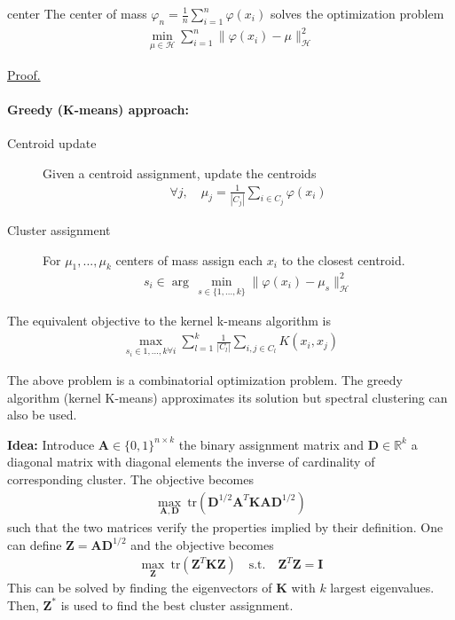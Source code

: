 \documentclass[10pt]{article}
\begin{document}
\begin{Proposition}{}{center}
  The center of mass $\varphi_n = \frac{1}{n}\sum_{i=1}^n\varphi(x_i)$ solves
  the optimization problem
  \begin{align*}
    \min_{\mu \in \mathcal{H}}\sum_{i=1}^n\lVert \varphi(x_i) - \mu 
    \rVert^2_\mathcal{H}
  \end{align*}
  \par \hfill \hyperref[prf:center]{\small Proof.}
\end{Proposition}

\paragraph{Greedy (K-means) approach:}
\begin{description}
  \item[Centroid update] Given a centroid assignment, update the centroids 
  \begin{align*}
    \forall j,\quad \mu_j = \frac{1}{|C_j|}\sum_{i\in C_j}\varphi(x_i)
  \end{align*} 
  \item[Cluster assignment] For $\mu_1, ..., \mu_k$ centers of mass assign each 
  $x_i$ to the closest centroid. 
  \begin{align*}
    s_i \in \arg\,\min_{s\in \{1, ..., k\}} \lVert \varphi(x_i) - \mu_s 
    \rVert^2_{\mathcal{H}}
  \end{align*}  
\end{description}

\begin{Proposition}{}{}
  The equivalent objective to the kernel k-means algorithm is 
  \begin{align*}
    \max_{s_i\in{1,...,k} \forall i}\sum_{l=1}^k \frac{1}{|C_l|}\sum_{i,j \in 
    C_l} K(x_i, x_j)
  \end{align*}
\end{Proposition}
The above problem is a combinatorial optimization problem. The greedy algorithm 
(kernel K-means) approximates its solution but spectral clustering can also be
used. 

\textbf{Idea: } Introduce $\mathbf{A} \in \{0, 1\}^{n\times k}$ the binary 
assignment matrix and $\mathbf{D} \in \mathbb{R}^k$ a diagonal matrix with 
diagonal elements the inverse of cardinality of corresponding cluster. The 
objective becomes
\begin{align*}
  \max_{\mathbf{A}, \mathbf{D}} \ \text{tr}(\mathbf{D}^{1/2}\mathbf{A}^T
  \mathbf{K}\mathbf{A}\mathbf{D}^{1/2})
\end{align*}
such that the two matrices verify the properties implied by their definition. 
One can define $\mathbf{Z} = \mathbf{A}\mathbf{D}^{1/2}$ and the objective 
becomes
\begin{align*}
  \max_{\mathbf{Z}} \ \text{tr}(\mathbf{Z}^T \mathbf{K}\mathbf{Z})\quad
   \text{s.t.}\quad\mathbf{Z}^T\mathbf{Z} = \mathbf{I}
\end{align*} 
This can be solved by finding the eigenvectors of $\mathbf{K}$ with $k$ largest 
eigenvalues. Then, $\mathbf{Z}^*$ is used to find the best cluster assignment.
\end{document}
